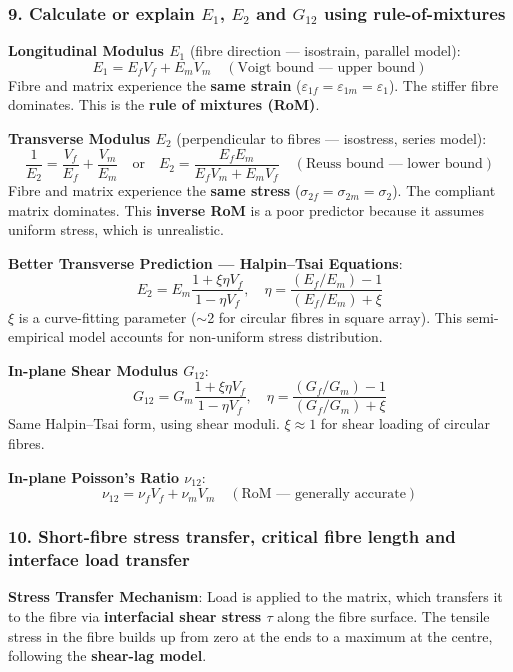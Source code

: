 \documentclass{NoteThesis/note-thesis}
\begin{document}
\subsubsection*{9. Calculate or explain $E_1$, $E_2$ and $G_{12}$ using rule-of-mixtures}

\textbf{Longitudinal Modulus $E_1$} (fibre direction — isostrain, parallel model):
\begin{equation*}
    E_1 = E_f V_f + E_m V_m \quad (\text{Voigt bound — upper bound})
\end{equation*}
Fibre and matrix experience the \textbf{same strain} ($\varepsilon_{1f} = \varepsilon_{1m} = \varepsilon_1$). The stiffer fibre dominates. This is the \textbf{rule of mixtures (RoM)}.

\textbf{Transverse Modulus $E_2$} (perpendicular to fibres — isostress, series model):
\begin{equation*}
    \frac{1}{E_2} = \frac{V_f}{E_f} + \frac{V_m}{E_m} \quad \text{or} \quad E_2 = \frac{E_f E_m}{E_f V_m + E_m V_f} \quad (\text{Reuss bound — lower bound})
\end{equation*}
Fibre and matrix experience the \textbf{same stress} ($\sigma_{2f} = \sigma_{2m} = \sigma_2$). The compliant matrix dominates. This \textbf{inverse RoM} is a poor predictor because it assumes uniform stress, which is unrealistic.

\textbf{Better Transverse Prediction — Halpin--Tsai Equations}:
\begin{equation*}
    E_2 = E_m \frac{1 + \xi \eta V_f}{1 - \eta V_f}, \quad \eta = \frac{(E_f/E_m) - 1}{(E_f/E_m) + \xi}
\end{equation*}
$\xi$ is a curve-fitting parameter ($\sim$2 for circular fibres in square array). This semi-empirical model accounts for non-uniform stress distribution.

\textbf{In-plane Shear Modulus $G_{12}$}:
\begin{equation*}
    G_{12} = G_m \frac{1 + \xi \eta V_f}{1 - \eta V_f}, \quad \eta = \frac{(G_f/G_m) - 1}{(G_f/G_m) + \xi}
\end{equation*}
Same Halpin--Tsai form, using shear moduli. $\xi \approx 1$ for shear loading of circular fibres.

\textbf{In-plane Poisson's Ratio $\nu_{12}$}:
\begin{equation*}
    \nu_{12} = \nu_f V_f + \nu_m V_m \quad (\text{RoM — generally accurate})
\end{equation*}

\subsubsection*{10. Short-fibre stress transfer, critical fibre length and interface load transfer}
    \textbf{Stress Transfer Mechanism}:
    Load is applied to the matrix, which transfers it to the fibre via \textbf{interfacial shear stress $\tau$} along the fibre surface. The tensile stress in the fibre builds up from zero at the ends to a maximum at the centre, following the \textbf{shear-lag model}.
\end{document}
